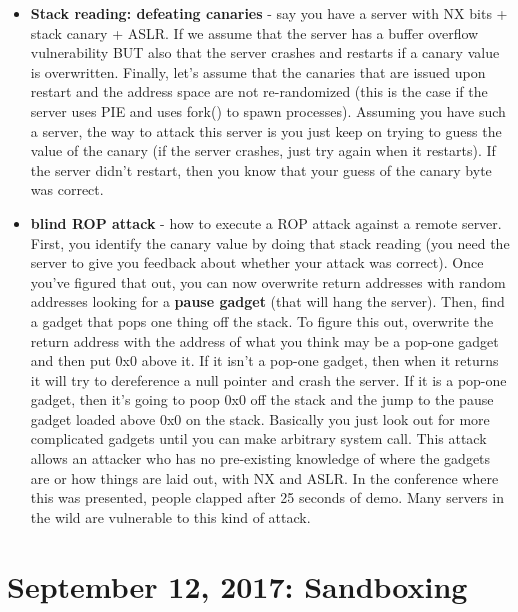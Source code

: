 \documentclass[12pt]{article}
\theoremstyle{definition}
\begin{document}
\begin{itemize}
    \item \textbf{Stack reading: defeating canaries} - say you have a server with NX bits + stack canary + ASLR. If we assume that the server has a buffer overflow vulnerability BUT also that the server crashes and restarts if a canary value is overwritten. Finally, let's assume that the canaries that are issued upon restart and the address space are not re-randomized (this is the case if the server uses PIE and uses fork() to spawn processes). Assuming you have such a server, the way to attack this server is you just keep on trying to guess the value of the canary (if the server crashes, just try again when it restarts). If the server didn't restart, then you know that your guess of the canary byte was correct.
    \item \textbf{blind ROP attack} - how to execute a ROP attack against a remote server. First, you identify the canary value by doing that stack reading (you need the server to give you feedback about whether your attack was correct). Once you've figured that out, you can now overwrite return addresses with random addresses looking for a \textbf{pause gadget} (that will hang the server). Then, find a gadget that pops one thing off the stack. To figure this out, overwrite the return address with the address of what you think may be a pop-one gadget and then put 0x0 above it. If it isn't a pop-one gadget, then when it returns it will try to dereference a null pointer and crash the server. If it is a pop-one gadget, then it's going to poop 0x0 off the stack and the jump to the pause gadget loaded above 0x0 on the stack. Basically you just look out for more complicated gadgets until you can make arbitrary system call. This attack allows an attacker who has no pre-existing knowledge of where the gadgets are or how things are laid out, with NX and ASLR. In the conference where this was presented, people clapped after 25 seconds of demo. Many servers in the wild are vulnerable to this kind of attack.
\end{itemize}

\section{September 12, 2017: Sandboxing}
\end{document}
